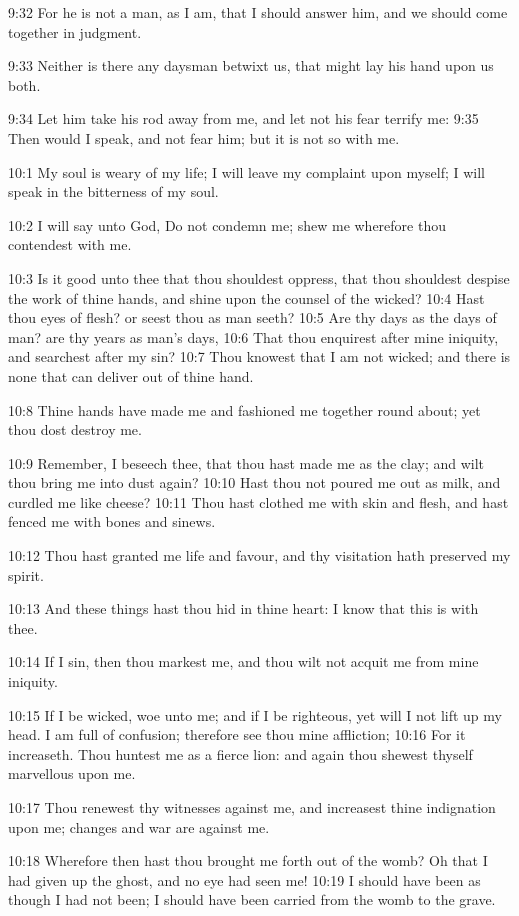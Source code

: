 9:32 For he is not a man, as I am, that I should answer him, and we should come together in judgment.

9:33 Neither is there any daysman betwixt us, that might lay his hand upon us both.

9:34 Let him take his rod away from me, and let not his fear terrify me: 9:35 Then would I speak, and not fear him; but it is not so with me.

10:1 My soul is weary of my life; I will leave my complaint upon myself; I will speak in the bitterness of my soul.

10:2 I will say unto God, Do not condemn me; shew me wherefore thou contendest with me.

10:3 Is it good unto thee that thou shouldest oppress, that thou shouldest despise the work of thine hands, and shine upon the counsel of the wicked?  10:4 Hast thou eyes of flesh? or seest thou as man seeth?  10:5 Are thy days as the days of man? are thy years as man's days, 10:6 That thou enquirest after mine iniquity, and searchest after my sin?  10:7 Thou knowest that I am not wicked; and there is none that can deliver out of thine hand.

10:8 Thine hands have made me and fashioned me together round about; yet thou dost destroy me.

10:9 Remember, I beseech thee, that thou hast made me as the clay; and wilt thou bring me into dust again?  10:10 Hast thou not poured me out as milk, and curdled me like cheese?  10:11 Thou hast clothed me with skin and flesh, and hast fenced me with bones and sinews.

10:12 Thou hast granted me life and favour, and thy visitation hath preserved my spirit.

10:13 And these things hast thou hid in thine heart: I know that this is with thee.

10:14 If I sin, then thou markest me, and thou wilt not acquit me from mine iniquity.

10:15 If I be wicked, woe unto me; and if I be righteous, yet will I not lift up my head. I am full of confusion; therefore see thou mine affliction; 10:16 For it increaseth. Thou huntest me as a fierce lion: and again thou shewest thyself marvellous upon me.

10:17 Thou renewest thy witnesses against me, and increasest thine indignation upon me; changes and war are against me.

10:18 Wherefore then hast thou brought me forth out of the womb? Oh that I had given up the ghost, and no eye had seen me!  10:19 I should have been as though I had not been; I should have been carried from the womb to the grave.

